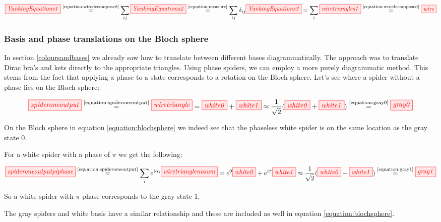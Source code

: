 \documentclass[]{article}
\newcommand{\equaltext}[1]{\ensuremath{\stackrel{\text{#1}}{=}}}
\begin{document}
\begin{equation}
	\tikzfig{YankingEquations1} \equaltext{\ref{equation:wiredecomposed}} \sum\limits_{ij} \tikzfig{YankingEquations2} \equaltext{\ref{equation:measure}} \sum\limits_{ij} \delta_{ij} \tikzfig{YankingEquations3} = \sum\limits_{i} \tikzfig{wiretriangles1} \equaltext{\ref{equation:wiredecomposed}} \tikzfig{wire}
\end{equation}

\subsubsection{Basis and phase translations on the Bloch sphere}

In section \ref{coloursandbases} we already saw how to translate between different bases diagrammatically. The approach was to translate Dirac bra's and kets directly to the appropriate triangles. Using phase spiders, we can employ a more purely diagrammatic method. This stems from the fact that applying a phase to a state corresponds to a rotation on the Bloch sphere. Let's see where a spider without a phase lies on the Bloch sphere:

\begin{equation}
\tikzfig{spideroneoutput} \equaltext{\ref{equation:spideroneoutput}} \tikzfig{wiretriangle} = \tikzfig{white0} + \tikzfig{white1} \approx \frac{1}{\sqrt{2}}(\tikzfig{white0} + \tikzfig{white1}) \equaltext{\ref{equation:gray0}} \tikzfig{gray0}
\end{equation}

On the Bloch sphere in equation \ref{equation:blochsphere} we indeed see that the phaseless white spider is on the same location as the gray state 0.

For a white spider with a phase of $\pi$ we get the following:

\begin{equation}
\tikzfig{spideroneoutputpiphase} \equaltext{\ref{equation:spideroneoutput}} \sum\limits_{i} e^{i\alpha_i}\tikzfig{wiretrianglenosum} = e^{0}\tikzfig{white0} + e^{i\pi}\tikzfig{white1} \approx \frac{1}{\sqrt{2}}(\tikzfig{white0} - \tikzfig{white1}) \equaltext{\ref{equation:gray1}} \tikzfig{gray1}
\end{equation}

So a white spider with $\pi$ phase corresponds to the gray state 1. 

The gray spiders and white basis have a similar relationship and these are included as well in equation \ref{equation:blochsphere}.
\end{document}
